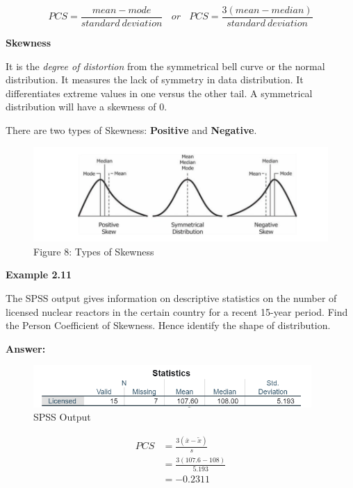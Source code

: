 \documentclass[
  a4paper,
  DIV=11,
  numbers=noendperiod,
  oneside]{scrreprt}
\begin{document}
\[
PCS = \frac{mean - mode}{standard\ deviation}\ \ \ \ or\ \ \ \ PCS = \frac{3(mean - median)}{standard\ deviation}
\]

\textbf{Skewness}

It is the \emph{degree of distortion} from the symmetrical bell curve or
the normal distribution. It measures the lack of symmetry in data
distribution. It differentiates extreme values in one versus the other
tail. A symmetrical distribution will have a skewness of 0.

There are two types of Skewness: \textbf{Positive} and
\textbf{Negative}.

\begin{figure}

{\centering \includegraphics[width=5.20833in,height=\textheight]{images/ch2/picture14.png}

}

\caption{Figure 8: Types of Skewness}

\end{figure}

{\textbf{Example 2.11}}

The SPSS output gives information on descriptive statistics on the
number of licensed nuclear reactors in the certain country for a recent
15-year period. Find the Person Coefficient of Skewness. Hence identify
the shape of distribution.

{\textbf{Answer:}}

\begin{figure}

{\centering \includegraphics[width=4.16667in,height=\textheight]{images/ch2/picture15.png}

}

\caption{SPSS Output}

\end{figure}

\[
\begin{aligned}
PCS &= \frac{3(\bar{x} - \tilde{x})}{s} \\
&= \frac{3(107.6 - 108)}{5.193} \\
&= -0.2311
\end{aligned}
\]
\end{document}
